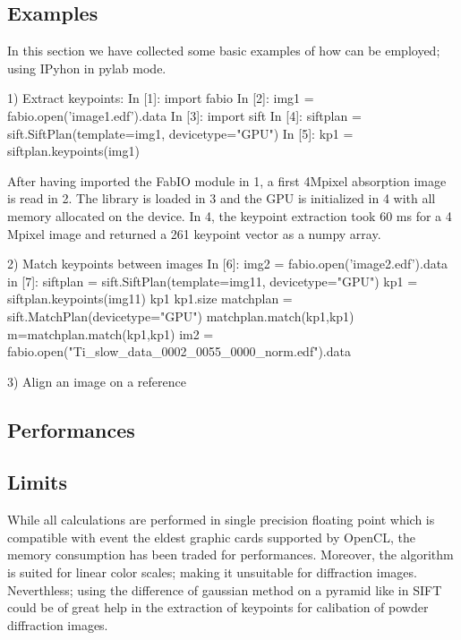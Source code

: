 \documentclass[preprint]{iucr}
\begin{document}
\subsection{Examples}

In this section we have collected some basic examples of how
 can be employed; using IPyhon\cite{ipython} in
pylab\cite{matplotlib} mode.

1) Extract keypoints:
In [1]: import fabio
In [2]: img1 = fabio.open('image1.edf').data
In [3]: import sift
In [4]: siftplan = sift.SiftPlan(template=img1, devicetype="GPU")
In [5]: kp1 = siftplan.keypoints(img1)

After having imported the FabIO\cite{fabio} module in 1, a first
4Mpixel absorption image is read in 2. The library is loaded in 3 and the GPU is
initialized in 4 with all memory allocated on the device.
In 4, the keypoint extraction took 60 ms for a
4 Mpixel image and returned a 261 keypoint vector as a numpy array.

2) Match keypoints between images
In [6]: img2 = fabio.open('image2.edf').data
in [7]:
siftplan = sift.SiftPlan(template=img11, devicetype="GPU")
kp1 = siftplan.keypoints(img11)
kp1
kp1.size
matchplan = sift.MatchPlan(devicetype="GPU")
matchplan.match(kp1,kp1)
m=matchplan.match(kp1,kp1)
im2 = fabio.open("Ti_slow_data_0002_0055_0000_norm.edf").data

3) Align an image on a reference



\subsection{Performances}

\subsection{Limits}
While all calculations are performed in single precision floating point which is
compatible with event the eldest graphic cards supported by OpenCL, the memory
consumption has been traded for performances. Moreover, the algorithm is suited
for linear color scales; making it unsuitable for diffraction images.
Neverthless; using the difference of gaussian method on a pyramid like in
SIFT could be of great help in the extraction of keypoints for calibation of
powder diffraction images.
\end{document}
